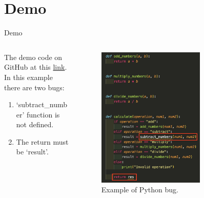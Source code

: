 \section{Demo}

\begin{frame}{Demo}
    \begin{columns}[T]
        \begin{column}{0.5\textwidth}
            The demo code on GitHub at this \href{https://github.com/tqtensor/wolverine}{link}.\\
            In this example there are two bugs:
            \begin{enumerate}
                \item `subtract\_number' function is not defined.

                \item The return must be `result'.
            \end{enumerate}
        \end{column}
        \begin{column}{0.5\textwidth}
            \begin{figure}[!htb]
                \centering
                \includegraphics[width=0.7\textwidth]{img/demo}
                \captionsetup{font=small,labelformat=empty}
                \caption{Example of Python bug.}
            \end{figure}
        \end{column}
    \end{columns}
\end{frame}
